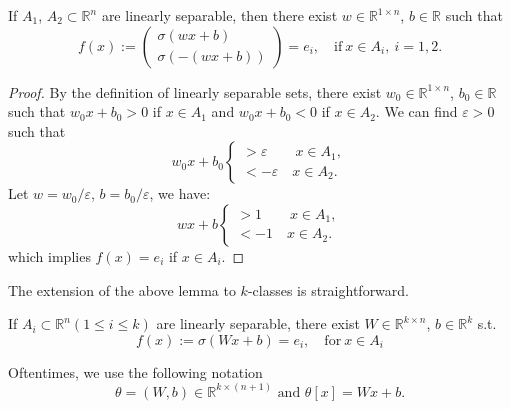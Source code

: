 \begin{lemma}
	If $A_1$, $A_2\subset\mathbb{R}^n$ are linearly separable, then there exist $w\in\mathbb{R}^{1\times n}$, $b\in\mathbb{R}$ such that
	\begin{equation}
	f(x):=\left( \begin{array}{cc}
	\sigma(wx+b) \\
	\sigma(-(wx+b))
	\end{array}
	\right)
	= e_i,\quad\mathrm{if}\ x\in A_i,\ i=1,2.
	\end{equation}
\end{lemma}
\begin{proof}
  By the definition of linearly separable sets, there exist
  $w_0\in\mathbb{R}^{1\times n}$, $b_0\in\mathbb{R}$ such that
  $w_0x+b_0>0$ if $x\in A_1$ and $w_0x+b_0<0$ if $x\in A_2$. We can
  find $\varepsilon>0$ such that
\begin{equation}
w_0x+b_0\begin{cases}
>\varepsilon \qquad x\in A_1, \\
<-\varepsilon \quad x\in A_2 .
\end{cases}
\end{equation}
Let $w=w_0/\varepsilon$, $b=b_0/\varepsilon$, we have:
\begin{equation}
wx+b\begin{cases}
>1 \qquad x\in A_1, \\
<-1 \quad x\in A_2 .
\end{cases}
\end{equation}
which implies $f(x)=e_i$ if $x\in A_i$.
\end{proof}

The extension of the above lemma to $k$-classes is straightforward.
\begin{lemma}
  If $A_i \subset \mathbb{R}^n(1\le i \le k)$ are linearly separable,
  there exist $W\in\mathbb{R}^{k\times n}$, $b\in\mathbb{R}^k$ s.t.
\begin{equation}
  \label{simple-f}
	f(x):=\sigma(Wx+b) = e_i,\quad\mathrm{for\ }x\in A_i  
\end{equation}
\end{lemma}

Oftentimes, we use the following notation
\begin{equation}
  \label{theta}
\theta=(W,b)\in\mathbb{R}^{k\times(n+1)} \mbox{ and } \theta[x]=Wx+b.
\end{equation}

